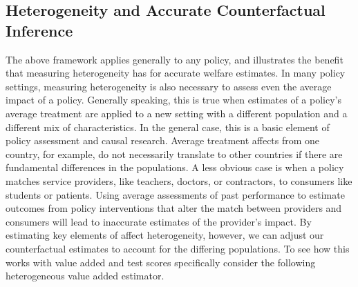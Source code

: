\documentclass[12pt]{article}
\theoremstyle{definition}
\theoremstyle{definition}
\theoremstyle{definition}
\theoremstyle{definition}
\begin{document}
    
   \subsection{Heterogeneity and Accurate Counterfactual Inference}
   \label{va_hetero}
   
   The above framework applies generally to any policy, and illustrates the benefit that measuring heterogeneity has for accurate welfare estimates. In many policy settings, measuring heterogeneity is also necessary to assess even the average impact of a policy. Generally speaking, this is true when estimates of a policy's average treatment are applied to a new setting with a different population and a different mix of characteristics. In the general case, this is a basic element of policy assessment and causal research. Average treatment affects from one country, for example, do not necessarily translate to other countries if there are fundamental differences in the populations. A less obvious case is when a policy matches service providers, like teachers, doctors, or contractors, to consumers like students or patients. Using average assessments of past performance to estimate outcomes from policy interventions that alter the match between providers and consumers will lead to inaccurate estimates of the provider's impact. By estimating key elements of affect heterogeneity, however, we can adjust our counterfactual estimates to account for the differing populations. To see how this works with value added and test scores specifically consider the following heterogeneous value added estimator. 
   
\end{document}
